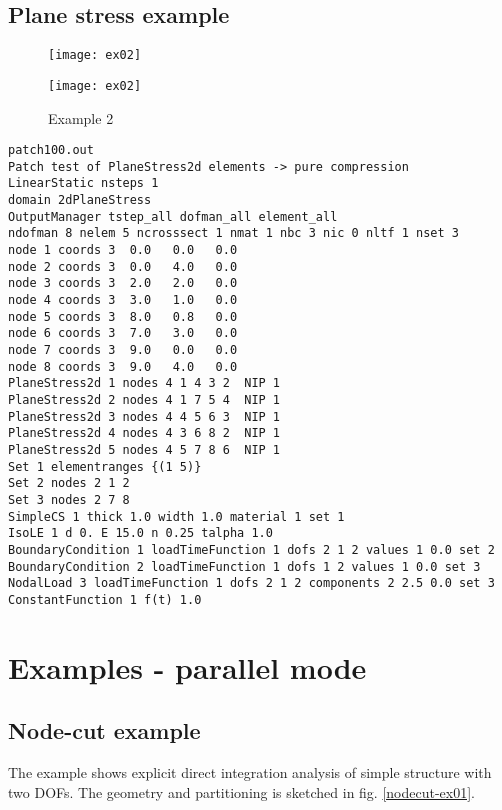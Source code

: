 \documentclass[a4paper]{article}
\begin{document}
\subsection {Plane stress example}
\begin{figure}[htb]
\begin{htmlonly}
  \centerline{\texttt{[image: ex02]}}
\end{htmlonly}
\centerline{\texttt{[image: ex02]}}
\caption{Example 2}
\label{ex02}
\end{figure}
{\small\begin{verbatim}
patch100.out
Patch test of PlaneStress2d elements -> pure compression
LinearStatic nsteps 1
domain 2dPlaneStress
OutputManager tstep_all dofman_all element_all
ndofman 8 nelem 5 ncrosssect 1 nmat 1 nbc 3 nic 0 nltf 1 nset 3
node 1 coords 3  0.0   0.0   0.0
node 2 coords 3  0.0   4.0   0.0
node 3 coords 3  2.0   2.0   0.0
node 4 coords 3  3.0   1.0   0.0
node 5 coords 3  8.0   0.8   0.0
node 6 coords 3  7.0   3.0   0.0
node 7 coords 3  9.0   0.0   0.0
node 8 coords 3  9.0   4.0   0.0
PlaneStress2d 1 nodes 4 1 4 3 2  NIP 1
PlaneStress2d 2 nodes 4 1 7 5 4  NIP 1
PlaneStress2d 3 nodes 4 4 5 6 3  NIP 1
PlaneStress2d 4 nodes 4 3 6 8 2  NIP 1
PlaneStress2d 5 nodes 4 5 7 8 6  NIP 1
Set 1 elementranges {(1 5)}
Set 2 nodes 2 1 2
Set 3 nodes 2 7 8
SimpleCS 1 thick 1.0 width 1.0 material 1 set 1
IsoLE 1 d 0. E 15.0 n 0.25 talpha 1.0
BoundaryCondition 1 loadTimeFunction 1 dofs 2 1 2 values 1 0.0 set 2
BoundaryCondition 2 loadTimeFunction 1 dofs 1 2 values 1 0.0 set 3
NodalLoad 3 loadTimeFunction 1 dofs 2 1 2 components 2 2.5 0.0 set 3
ConstantFunction 1 f(t) 1.0
\end{verbatim}}


\section{Examples - parallel mode}
\subsection{Node-cut example}
The example shows explicit direct integration analysis of
simple structure with two DOFs.
The geometry and partitioning is sketched in
fig. \ref{nodecut-ex01}.
\end{document}
